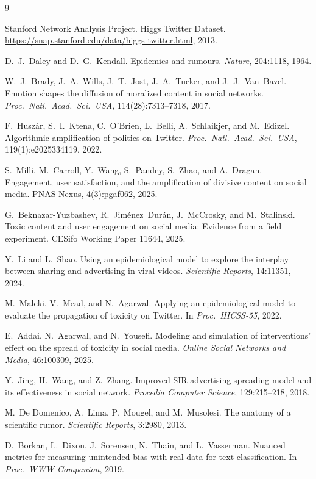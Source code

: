 \documentclass[11pt]{article}
\begin{document}
\begingroup
\footnotesize
\begin{thebibliography}{9}

Stanford Network Analysis Project.
Higgs Twitter Dataset.
\url{https://snap.stanford.edu/data/higgs-twitter.html}, 2013.

D.~J.~Daley and D.~G.~Kendall.
Epidemics and rumours.
\textit{Nature}, 204:1118, 1964.

W.~J.~Brady, J.~A.~Wills, J.~T.~Jost, J.~A.~Tucker, and J.~J.~Van~Bavel.
Emotion shapes the diffusion of moralized content in social networks.
\textit{Proc.\ Natl.\ Acad.\ Sci.\ USA}, 114(28):7313--7318, 2017.

F.~Husz\'{a}r, S.~I.~Ktena, C.~O'Brien, L.~Belli, A.~Schlaikjer, and M.~Edizel.
Algorithmic amplification of politics on Twitter.
\textit{Proc.\ Natl.\ Acad.\ Sci.\ USA}, 119(1):e2025334119, 2022.

S.~Milli, M.~Carroll, Y.~Wang, S.~Pandey, S.~Zhao, and A.~Dragan.
Engagement, user satisfaction, and the amplification of divisive content on social media.
PNAS Nexus, 4(3):pgaf062, 2025.

G.~Beknazar-Yuzbashev, R.~Jim\'{e}nez~Dur\'{a}n, J.~McCrosky, and M.~Stalinski.
Toxic content and user engagement on social media: Evidence from a field experiment.
CESifo Working Paper 11644, 2025.

Y.~Li and L.~Shao.
Using an epidemiological model to explore the interplay between sharing and advertising in viral videos.
\textit{Scientific Reports}, 14:11351, 2024.

M.~Maleki, V.~Mead, and N.~Agarwal.
Applying an epidemiological model to evaluate the propagation of toxicity on Twitter.
In \textit{Proc.\ HICSS-55}, 2022.

E.~Addai, N.~Agarwal, and N.~Yousefi.
Modeling and simulation of interventions' effect on the spread of toxicity in social media.
\textit{Online Social Networks and Media}, 46:100309, 2025.

Y.~Jing, H.~Wang, and Z.~Zhang.
Improved SIR advertising spreading model and its effectiveness in social network.
\textit{Procedia Computer Science}, 129:215--218, 2018.

M.~De Domenico, A.~Lima, P.~Mougel, and M.~Musolesi.
The anatomy of a scientific rumor.
\textit{Scientific Reports}, 3:2980, 2013.

D.~Borkan, L.~Dixon, J.~Sorensen, N.~Thain, and L.~Vasserman.
Nuanced metrics for measuring unintended bias with real data for text classification.
In \textit{Proc.\ WWW Companion}, 2019.

\end{thebibliography}
\endgroup
\end{document}
